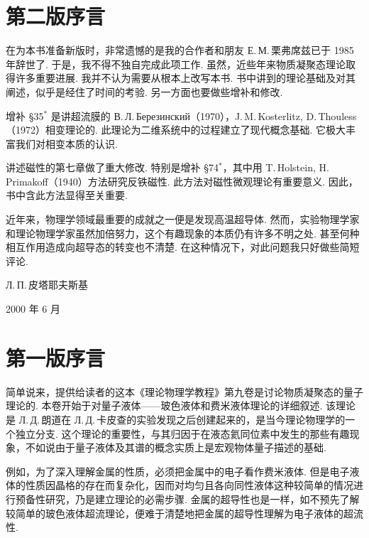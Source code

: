 \chapter*{第二版序言}

在为本书准备新版时，非常遗憾的是我的合作者和朋友 Е.\,М.\,栗弗席兹已于 1985 年辞世了. 于是，我不得不独自完成此项工作. 虽然，近些年来物质凝聚态理论取得许多重要进展. 我并不认为需要从根本上改写本书. 书中讲到的理论基础及对其阐述，似乎是经住了时间的考验. 另一方面也要做些增补和修改.

增补 §35$^{*}$ 是讲超流膜的 В.\,Л.\,Березинский（1970），J.\,M.\,Kosterlitz, D.\,Thouless（1972）相变理论的. 此理论为二维系统中的过程建立了现代概念基础. 它极大丰富我们对相变本质的认识.

讲述磁性的第七章做了重大修改. 特别是增补 §74$^{*}$，其中用 T.\,Holstein, H.\,Primakoff（1940）方法研究反铁磁性. 此方法对磁性微观理论有重要意义. 因此，书中含此方法显得至关重要.

近年来，物理学领域最重要的成就之一便是发现高温超导体. 然而，实验物理学家和理论物理学家虽然加倍努力，这个有趣现象的本质仍有许多不明之处. 甚至何种相互作用造成向超导态的转变也不清楚. 在这种情况下，对此问题我只好做些简短评论.

\begin{flushright}
Л.\,П.\,皮塔耶夫斯基

2000 年 6 月
\end{flushright}

\chapter*{第一版序言}

简单说来，提供给读者的这本《理论物理学教程》第九卷是讨论物质凝聚态的量子理论的. 本卷开始于对量子液体——玻色液体和费米液体理论的详细叙述. 该理论是 Л.\,Д.\,朗道在 Л.\,Д.\,卡皮查的实验发现之后创建起来的，是当今理论物理学的一个独立分支. 这个理论的重要性，与其归因于在液态氦同位素中发生的那些有趣现象，不如说由于量子液体及其谱的概念实质上是宏观物体量子描述的基础.

例如，为了深入理解金属的性质，必须把金属中的电子看作费米液体. 但是电子液体的性质因晶格的存在而复杂化，因而对均匀且各向同性液体这种较简单的情况进行预备性研究，乃是建立理论的必需步骤. 金属的超导性也是一样，如不预先了解较简单的玻色液体超流理论，便难于清楚地把金属的超导性理解为电子液体的超流性.

